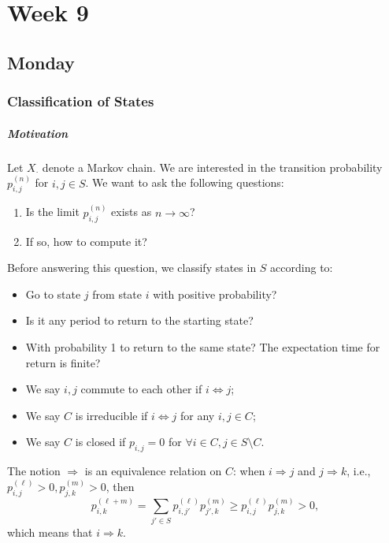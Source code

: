
\chapter{Week 9}

\section{Monday}
\subsection{Classification of States}

\paragraph{Motivation}
Let $X_{\cdot}$ denote a Markov chain.
We are interested in the transition probability $p_{i,j}^{(n)}$ for $i,j\in S$.
We want to ask the following questions:
\begin{enumerate}
\item
Is the limit $p_{i,j}^{(n)}$ exists as $n\to\infty$?
\item
If so, how to compute it?
\end{enumerate}
Before answering this question, we classify states in $S$ according to:
\begin{itemize}
\item
Go to state $j$ from state $i$ with positive probability?
\item
Is it any period to return to the starting state?
\item
With probability 1 to return to the same state?
The expectation time for return is finite?
\end{itemize}

\begin{definition}
\begin{itemize}
\item
We say $i,j$ commute to each other if $i\Leftrightarrow j$;
\item
We say $C$ is irreducible if $i\Leftrightarrow j$ for any $i,j\in C$;
\item
We say $C$ is closed if $p_{i,j}=0$ for $\forall i\in C, j\in S\setminus C$.
\end{itemize}
\end{definition}
The notion $\Rightarrow$ is an equivalence relation on $C$: 
when $i\Rightarrow j$ and $j\Rightarrow k$, i.e., $p_{i,j}^{(\ell)}>0, p_{j,k}^{(m)}>0$, then
\[
p_{i,k}^{(\ell+m)}=\sum_{j'\in S}p_{i,j'}^{(\ell)}p_{j',k}^{(m)}\ge p_{i,j}^{(\ell)}p_{j,k}^{(m)}>0,
\]
which means that $i\Rightarrow k$.

